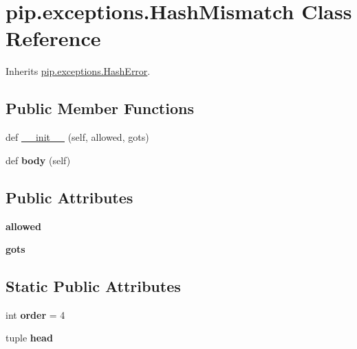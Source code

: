 \hypertarget{classpip_1_1exceptions_1_1_hash_mismatch}{}\section{pip.\+exceptions.\+Hash\+Mismatch Class Reference}
\label{classpip_1_1exceptions_1_1_hash_mismatch}


Inherits \hyperlink{classpip_1_1exceptions_1_1_hash_error}{pip.\+exceptions.\+Hash\+Error}.

\subsection*{Public Member Functions}
\begin{DoxyCompactItemize}
\item 
def \hyperlink{classpip_1_1exceptions_1_1_hash_mismatch_a93257ed7d14ba873ad101ab089f1046d}{\+\_\+\+\_\+init\+\_\+\+\_\+} (self, allowed, gots)
\item 
\mbox{\label{classpip_1_1exceptions_1_1_hash_mismatch_a538200e2164d37e674beeb25e660dc6e}} 
def {\bfseries body} (self)
\end{DoxyCompactItemize}
\subsection*{Public Attributes}
\begin{DoxyCompactItemize}
\item 
\mbox{\label{classpip_1_1exceptions_1_1_hash_mismatch_a5917ca036966d76548ec97c16fddea4a}} 
{\bfseries allowed}
\item 
\mbox{\label{classpip_1_1exceptions_1_1_hash_mismatch_a5be1ede118cf9d20bf929f9a29c3322d}} 
{\bfseries gots}
\end{DoxyCompactItemize}
\subsection*{Static Public Attributes}
\begin{DoxyCompactItemize}
\item 
\mbox{\label{classpip_1_1exceptions_1_1_hash_mismatch_a25618466d1333da33282e5bc43d57a21}} 
int {\bfseries order} = 4
\item 
tuple {\bfseries head}
\end{DoxyCompactItemize}


